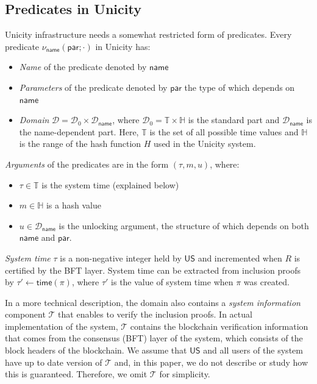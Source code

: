 \documentclass{article}
\newcommand{\unisrv}[0]{\mathsf{US}}
\begin{document}
\subsection{Predicates in Unicity}
Unicity infrastructure needs a somewhat restricted form of predicates.
Every predicate $\nu_\mathsf{name}(\mathsf{par};\cdot)$ in Unicity has:
\begin{itemize}
\item \emph{Name} of the predicate denoted by $\mathsf{name}$
\item \emph{Parameters} of the predicate denoted by $\mathsf{par}$ the type of which depends on $\mathsf{name}$
\item \emph{Domain} $\mathcal{D}=\mathcal{D}_0\times\mathcal{D}_\mathsf{name}$, where $\mathcal{D}_0=\mathbb{T}\times\mathbb{H}$ is the standard part and
$\mathcal{D}_\mathsf{name}$ is the name-dependent part. Here, $\mathbb{T}$ is the set of all possible time values and $\mathbb{H}$ is the range of the hash function $H$ used in the Unicity system.
\end{itemize}
\medskip

\noindent \emph{Arguments} of the predicates are in the form $(\tau,m,u)$, where:
\begin{itemize}
\item $\tau\in\mathbb{T}$ is the system time (explained below)
\item $m\in \mathbb{H}$ is a hash value
\item $u\in\mathcal{D}_\mathsf{name}$ is the unlocking argument, the structure of which depends on both $\mathsf{name}$ and $\mathsf{par}$.
\end{itemize}
\medskip

\noindent\emph{System time} $\tau$ is a non-negative integer held by $\unisrv$ and incremented when $R$ is certified by the BFT layer.
System time can be extracted from inclusion proofs by $\tau'\gets \mathsf{time}(\pi)$, where $\tau'$ is the value of system time when $\pi$ was created.
\medskip

\noindent In a more technical description, the domain also contains a \emph{system information} component $\mathcal{T}$ that enables to verify the inclusion proofs. In actual implementation of the system, $\mathcal{T}$ contains the blockchain verification information that comes from the consensus (BFT) layer of the system, which consists of the block headers of the blockchain. We assume that $\unisrv$ and all users of the system have up to date version of $\mathcal{T}$ and, in this paper, we do not describe or study how this is guaranteed. Therefore, we omit $\mathcal{T}$ for simplicity. \medskip
\end{document}
